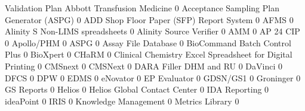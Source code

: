 \documentclass{article}
\begin{document}
\begin{Schunk}
\begin{Soutput}
                                                            Validation Plan
  Abbott Transfusion Medicine                                             0
  Acceptance Sampling Plan Generator (ASPG)                               0
  ADD Shop Floor Paper (SFP) Report System                                0
  AFMS                                                                    0
  Alinity S Non-LIMS spreadsheets                                         0
  Alinity Source Verifier                                                 0
  AMM                                                                     0
  AP 24 CIP                                                               0
  Apollo/PHM                                                              0
  ASPG                                                                    0
  Assay File Database                                                     0
  BioCommand Batch Control Plus                                           0
  BioXpert                                                                0
  CHaRM                                                                   0
  Clinical Chemistry Excel Spreadsheet for Digital Printing               0
  CMSnext                                                                 0
  CMSNext                                                                 0
  DARA Filler DHM and RU                                                  0
  DaVinci                                                                 0
  DFCS                                                                    0
  DPW                                                                     0
  EDMS                                                                    0
  eNovator                                                                0
  EP Evaluator                                                            0
  GDSN/GS1                                                                0
  Groninger                                                               0
  GS Reports                                                              0
  Helios                                                                  0
  Helios Global Contact Center                                            0
  IDA Reporting                                                           0
  ideaPoint                                                               0
  IRIS                                                                    0
  Knowledge Management                                                    0
  Metrics Library                                                         0

\end{Soutput}
\end{Schunk}
\end{document}
